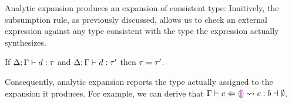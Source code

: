 %
Analytic expansion produces an expansion of consistent type:
%
Inuitively, the subsumption rule, as previously discussed, allows us
to check an external expression against any type consistent with the
type the expression actually synthesizes.


\begin{thm}
  If $\Delta; \Gamma \vdash d : \tau$
  and $\Delta; \Gamma \vdash d : \tau'$
  then $\tau=\tau'$.
\end{thm}
\noindent
Consequently, analytic expansion reports the type actually assigned to the expansion it produces.
%
For example, we can derive that $\Gamma \vdash c \Leftarrow \textcolor{violet}{\llparenthesis}\textcolor{violet}{\rrparenthesis} \leadsto c : b \dashv \emptyset$.%

